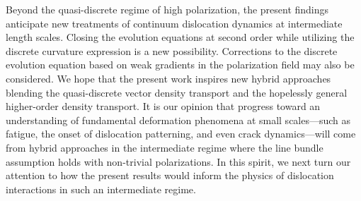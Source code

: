 Beyond the quasi-discrete regime of high polarization, the present findings anticipate new treatments of continuum dislocation dynamics at intermediate length scales. Closing the evolution equations at second order while utilizing the discrete curvature expression is a new possibility. Corrections to the discrete evolution equation based on weak gradients in the polarization field may also be considered. We hope that the present work inspires new hybrid approaches blending the quasi-discrete vector density transport and the hopelessly general higher-order density transport. It is our opinion that progress toward an understanding of fundamental deformation phenomena at small scales---such as fatigue, the onset of dislocation patterning, and even crack dynamics---will come from hybrid approaches in the intermediate regime where the line bundle assumption holds with non-trivial polarizations. In this spirit, we next turn our attention to how the present results would inform the physics of dislocation interactions in such an intermediate regime.

